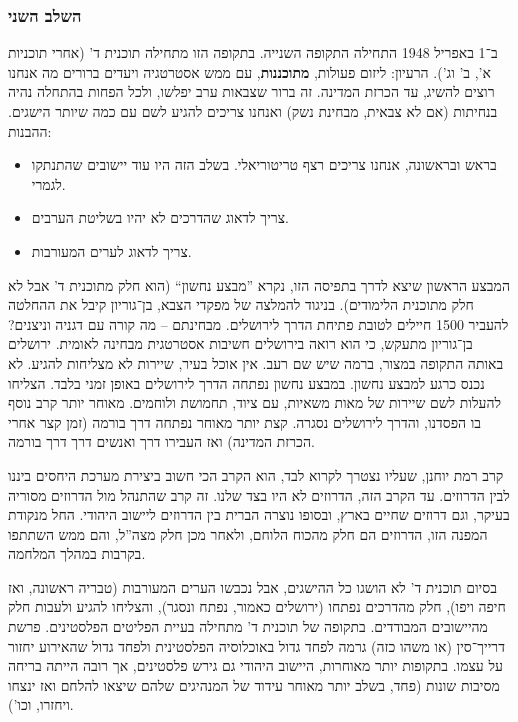 \documentclass[]{../../../../tex/classes/styledArticle}
\begin{document}
	\subsubsection*{השלב השני}
	ב־1 באפריל 1948 התחילה התקופה השנייה. בתקופה הזו מתחילה תוכנית ד' (אחרי תוכניות א', ב' וג'). הרעיון: ליזום פעולות, \textbf{מתוכננות}, עם ממש אסטרטגיה ויעדים ברורים מה אנחנו רוצים להשיג, עד הכרזת המדינה. זה ברור שצבאות ערב יפלשו, ולכל הפחות בהתחלה נהיה בנחיתות (אם לא צבאית, מבחינת נשק) ואנחנו צריכים להגיע לשם עם כמה שיותר הישגים. ההבנות: 
	\begin{itemize}
		\item בראש ובראשונה, אנחנו צריכים רצף טריטוריאלי. בשלב הזה היו עוד יישובים שהתנתקו לגמרי. 
		\item צריך לדאוג שהדרכים לא יהיו בשליטת הערבים. 
		\item צריך לדאוג לערים המעורבות. 
	\end{itemize}
	המבצע הראשון שיצא לדרך בתפיסה הזו, נקרא ''מבצע נחשון`` (הוא חלק מתוכנית ד' אבל לא חלק מתוכנית הלימודים). בניגוד להמלצה של מפקדי הצבא, בן־גוריון קיבל את ההחלטה להעביר 1500 חיילים לטובת פתיחת הדרך לירושלים. מבחינתם – מה קורה עם דגניה וניצנים? בן־גוריון מתעקש, כי הוא רואה בירושלים חשיבות אסטרטגית מבחינה לאומית. ירושלים באותה התקופה במצור, ברמה שיש שם רעב. אין אוכל בעיר, שיירות לא מצליחות להגיע. לא נכנס כרגע למבצע נחשון. במבצע נחשון נפתחה הדרך לירושלים באופן זמני בלבד. הצליחו להעלות לשם שיירות של מאות משאיות, עם ציוד, תחמושת ולוחמים. מאוחר יותר קרב נוסף בו הפסדנו, והדרך לירושלים נסגרה. קצת יותר מאוחר נפתחה דרך בורמה (זמן קצר אחרי הכרזת המדינה) ואז העבירו דרך ואנשים דרך דרך בורמה. 
	
	קרב רמת יוחנן, שעליו נצטרך לקרוא לבד, הוא הקרב הכי חשוב ביצירת מערכת היחסים ביננו לבין הדרוזים. עד הקרב הזה, הדרוזים לא היו בצד שלנו. זה קרב שהתנהל מול הדרוזים מסוריה בעיקר, וגם דרוזים שחיים בארץ, ובסופו נוצרה הברית בין הדרוזים ליישוב היהודי. החל מנקודת המפנה הזו, הדרוזים הם חלק מהכוח הלוחם, ולאחר מכן חלק מצה''ל, והם ממש השתתפו בקרבות במהלך המלחמה. 
	
	בסיום תוכנית ד' לא הושגו כל ההישגים, אבל נכבשו הערים המעורבות (טבריה ראשונה, ואז חיפה ויפו), חלק מהדרכים נפתחו (ירושלים כאמור, נפתח ונסגר), והצליחו להגיע ולעבות חלק מהיישובים המבודדים. בתקופה של תוכנית ד' מתחילה בעיית הפליטים הפלסטינים. פרשת דרייך־סין (או משהו כזה) גרמה לפחד גדול באוכלוסיה הפלסטינית ולפחד גדול שהאירוע יחזור על עצמו. בתקופות יותר מאוחרות, היישוב היהודי גם גירש פלסטינים, אך רובה הייתה בריחה מסיבות שונות (פחד, בשלב יותר מאוחר עידוד של המנהיגים שלהם שיצאו להלחם ואז ינצחו ויחזרו, וכו'). 
	
\end{document}
